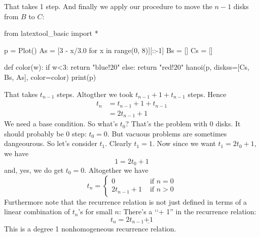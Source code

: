 That takes 1 step.
And finally we apply our procedure to move
the $n-1$ disks from $B$ to $C$:

\begin{python}
from latextool_basic import *

p = Plot()
As = [3 - x/3.0 for x in range(0, 8)][::-1]
Bs = []
Cs = []

def color(w):
    if w<3: return "blue!20"
    else: return "red!20"
hanoi(p, diskss=[Cs, Bs, As], color=color)
print(p)
\end{python}

That takes $t_{n-1}$ steps.
Altogther we took $t_{n-1} + 1 + t_{n-1}$ steps.
Hence
\begin{align*}
t_n 
&= t_{n-1} + 1 + t_{n-1} \\
&= 2 t_{n-1} + 1
\end{align*}
We need a base condition.
So what's $t_0$?
That's the problem with $0$ disks.
It should probably be 0 step: $t_0 = 0$.
But vacuous problems are sometimes dangeourous.
So let's consider $t_1$.
Clearly $t_1 = 1$.
Now since we want $t_1 = 2t_0 + 1$, we have
\[
1 = 2 t_0 + 1
\]
and, yes, we do get $t_0 = 0$.
Altogether we have
\[
t_n = 
\begin{cases}
0 &\text{ if } n = 0 \\
2 t_{n-1} + 1 &\text{ if } n > 0
\end{cases}
\]
Furthermore note that the recurrence relation is not just defined
in terms of a linear combination of $t_n$'s for small $n$:
There's a \lq\lq + 1'' in the recurrence relation:
\[
t_n = 2 t_{n-1} \underline{ + 1 }
\]
This is a degree 1 nonhomogeneous recurrence relation.


